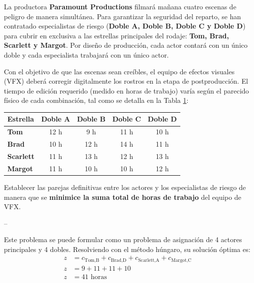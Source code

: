 La productora \textbf{Paramount Productions} filmará mañana cuatro escenas de peligro de manera simultánea. Para garantizar la seguridad del reparto, se han contratado especialistas de riesgo (\textbf{Doble A, Doble B, Doble C y Doble D}) para cubrir en exclusiva a las  estrellas principales del rodaje: \textbf{Tom, Brad, Scarlett y Margot}. Por diseño de producción, cada actor contará con un único doble y cada especialista trabajará con un único actor.

Con el objetivo de que las escenas sean creíbles, el equipo de efectos visuales (VFX) deberá corregir digitalmente los rostros en la etapa de postproducción. El tiempo de edición requerido (medido en horas de trabajo) varía según el parecido físico de cada combinación, tal como se detalla en la Tabla \ref{tab:paramount}:

\begin{table}[htbp]
\centering
\label{tab:paramount}
\begin{tabular}{lcccc}
\toprule
\textbf{Estrella} & \textbf{Doble A} & \textbf{Doble B} & \textbf{Doble C} & \textbf{Doble D} \\
\midrule
\textbf{Tom}      & 12 h & 9 h  & 11 h & 10 h \\
\textbf{Brad}     & 10 h & 12 h & 14 h & 11 h \\
\textbf{Scarlett} & 11 h & 13 h & 12 h & 13 h \\
\textbf{Margot}   & 11 h & 10 h & 10 h & 12 h \\
\bottomrule
\end{tabular}
\end{table}

Establecer las parejas definitivas entre los actores y los especialistas de riesgo de manera que se \textbf{minimice la suma total de horas de trabajo} del equipo de VFX.

--

Este problema se puede formular como un problema de asignación de 4 actores principales y 4 dobles.  Resolviendo con el método húngaro, su solución óptima es:
\begin{align*}
z &= c_{\text{Tom,B}} + c_{\text{Brad,D}} + c_{\text{Scarlett,A}} + c_{\text{Margot,C}} \\
z &= 9+11+11+10 \\
z &= 41 \text{ horas}
\end{align*}